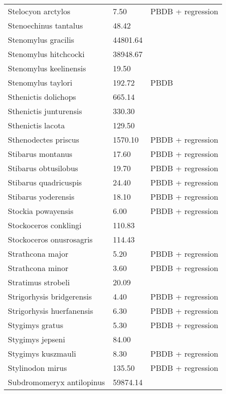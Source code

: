 \begin{longtable}{p{} p{} p{}}
    Stelocyon arctylos & 7.50 & PBDB + regression \\ 
    Stenoechinus tantalus & 48.42 & \cite{Tomiya2013} \\ 
    Stenomylus gracilis & 44801.64 & \cite{Tomiya2013} \\ 
    Stenomylus hitchcocki & 38948.67 & \cite{Tomiya2013} \\ 
    Stenomylus keelinensis & 19.50 & \cite{Czaplewski2012} \\ 
    Stenomylus taylori & 192.72 & PBDB \\ 
    Sthenictis dolichops & 665.14 & \cite{Tomiya2013} \\ 
    Sthenictis junturensis & 330.30 & \cite{Tomiya2013} \\ 
    Sthenictis lacota & 129.50 & \cite{Mihlbacher2006} \\ 
    Sthenodectes priscus & 1570.10 & PBDB + regression \\ 
    Stibarus montanus & 17.60 & PBDB + regression \\ 
    Stibarus obtusilobus & 19.70 & PBDB + regression \\ 
    Stibarus quadricuspis & 24.40 & PBDB + regression \\ 
    Stibarus yoderensis & 18.10 & PBDB + regression \\ 
    Stockia powayensis & 6.00 & PBDB + regression \\ 
    Stockoceros conklingi & 110.83 & \cite{Smith2004} \\ 
    Stockoceros onusrosagris & 114.43 & \cite{Smith2004} \\ 
    Strathcona major & 5.20 & PBDB + regression \\ 
    Strathcona minor & 3.60 & PBDB + regression \\ 
    Stratimus strobeli & 20.09 & \cite{Tomiya2013} \\ 
    Strigorhysis bridgerensis & 4.40 & PBDB + regression \\ 
    Strigorhysis huerfanensis & 6.30 & PBDB + regression \\ 
    Stygimys gratus & 5.30 & PBDB + regression \\ 
    Stygimys jepseni & 84.00 & \cite{Wilson2012} \\ 
    Stygimys kuszmauli & 8.30 & PBDB + regression \\ 
    Stylinodon mirus & 135.50 & PBDB + regression \\ 
    Subdromomeryx antilopinus & 59874.14 & \cite{Tomiya2013} \\ 

\end{longtable}
